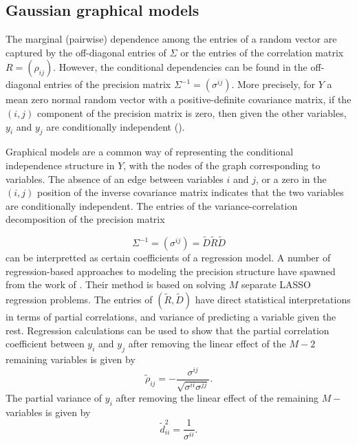 \subsection{Gaussian graphical models} 

The marginal (pairwise) dependence among the entries of a random vector are captured by the off-diagonal entries of $\Sigma$ or the entries of the correlation matrix $R = \left(\rho_{ij}\right)$. However, the conditional dependencies can be found in the off-diagonal entries of the precision matrix $\Sigma^{-1} = \left( \sigma^{ij} \right)$. More precisely, for $Y$ a mean zero normal random vector with a positive-definite covariance matrix, if the $\left(i,j\right)$ component of the precision matrix is zero, then given the other variables, $y_i$ and $y_j$ are conditionally independent (\cite{Anderson84a}). 

\bigskip

Graphical models are a common way of representing the conditional independence structure in $Y$, with the nodes of the graph corresponding to variables. The absence of an edge between variables $i$ and $j$, or a zero in the $\left(i,j\right)$ position of the inverse covariance matrix indicates that the two variables are conditionally independent. The entries of the variance-correlation decomposition of the precision matrix 

\begin{equation} \label{eq:inverse-covariance-decomposition}
\Sigma^{-1} = \left( \sigma^{ij}\right) = \tilde{D} \tilde{R} \tilde{D} 
\end{equation}
\noindent
can be interpretted as certain coefficients of a regression model. A number of regression-based approaches to modeling the precision structure have spawned from the work of \cite{Meinshausen2006highDimGraphs}. Their method is based on solving $M$ separate LASSO regression problems. The entries of $\left(\tilde{R}, \tilde{D}\right)$ have direct statistical interpretations in terms of partial correlations, and variance of predicting a variable given the rest. Regression calculations can be used to show that the partial correlation coefficient between $y_i$ and $y_j$ after removing the linear effect of the $M - 2$ remaining variables is given by 
\begin{equation} \label{eq:partial-correlation}
\tilde{\rho}_{ij}= -\frac{\sigma^{ij}}{\sqrt{\sigma^{ii}\sigma^{jj}}}.
\end{equation}
\noindent
The partial variance of $y_i$ after removing the linear effect of the remaining $M-$ variables is given by 
\begin{equation} \label{eq:partial-variance}
\tilde{d}^2_{ii}= \frac{1}{\sigma^{ii}}.
\end{equation}

